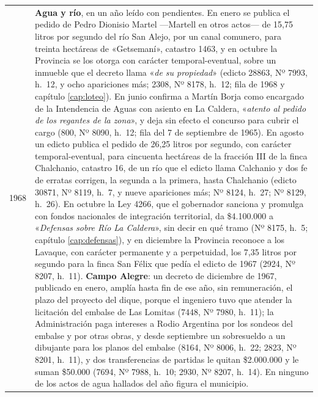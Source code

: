\begin{longtable}{@{}p{2.7cm}p{10.3cm}@{}}
1968 & \textbf{Agua y río}, en un año leído con pendientes. En enero se publica el pedido de Pedro Dionisio Martel ---Martell en otros actos--- de 15,75 litros por segundo del río San Alejo, por un canal comunero, para treinta hectáreas de «Getsemaní», catastro 1463, y en octubre la Provincia se los otorga con carácter temporal-eventual, sobre un inmueble que el decreto llama «\textit{de su propiedad}» (edicto 28863, Nº 7993, h.\ 12, y ocho apariciones más; 2308, Nº 8178, h.\ 12; fila de 1968 y capítulo \ref{cap:loteo}). En junio confirma a Martín Borja como encargado de la Intendencia de Aguas con asiento en La Caldera, «\textit{atento al pedido de los regantes de la zona}», y deja sin efecto el concurso para cubrir el cargo (800, Nº 8090, h.\ 12; fila del 7 de septiembre de 1965). En agosto un edicto publica el pedido de 26,25 litros por segundo, con carácter temporal-eventual, para cincuenta hectáreas de la fracción III de la finca Chalchanio, catastro 16, de un río que el edicto llama Calchanio y dos fe de erratas corrigen, la segunda a la primera, hasta Chalchanio (edicto 30871, Nº 8119, h.\ 7, y nueve apariciones más; Nº 8124, h.\ 27; Nº 8129, h.\ 26). En octubre la Ley 4266, que el gobernador sanciona y promulga con fondos nacionales de integración territorial, da \$4.100.000 a «\textit{Defensas sobre Río La Caldera}», sin decir en qué tramo (Nº 8175, h.\ 5; capítulo \ref{cap:defensas}), y en diciembre la Provincia reconoce a los Lavaque, con carácter permanente y a perpetuidad, los 7,35 litros por segundo para la finca San Félix que pedía el edicto de 1967 (2924, Nº 8207, h.\ 11). \textbf{Campo Alegre}: un decreto de diciembre de 1967, publicado en enero, amplía hasta fin de ese año, sin remuneración, el plazo del proyecto del dique, porque el ingeniero tuvo que atender la licitación del embalse de Las Lomitas (7448, Nº 7980, h.\ 11); la Administración paga intereses a Rodio Argentina por los sondeos del embalse y por otras obras, y desde septiembre un sobresueldo a un dibujante para los planos del embalse (8164, Nº 8006, h.\ 22; 2823, Nº 8201, h.\ 11), y dos transferencias de partidas le quitan \$2.000.000 y le suman \$50.000 (7694, Nº 7988, h.\ 10; 2930, Nº 8207, h.\ 14). En ninguno de los actos de agua hallados del año figura el municipio. \\

\end{longtable}
